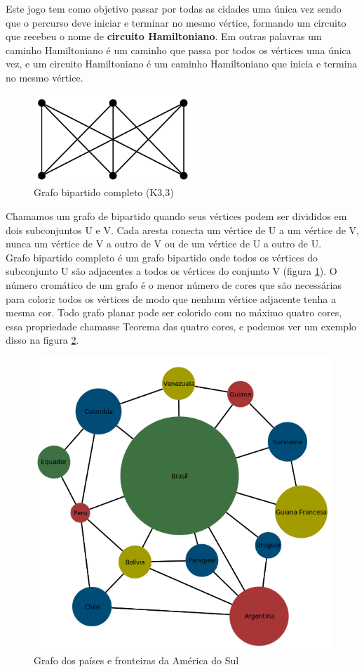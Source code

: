 \documentclass[a4paper]{abnt}
\begin{document}
Este jogo tem como objetivo passar por todas as cidades uma única vez sendo que o percurso deve iniciar e terminar no mesmo vértice, formando um circuito que recebeu o nome de \textbf{circuito Hamiltoniano}. Em outras palavras um caminho Hamiltoniano é um caminho que passa por todos os vértices uma única vez, e um circuito Hamiltoniano é um caminho Hamiltoniano que inicia e termina no mesmo vértice.

\begin{figure}[htb]
    \centering
	\includegraphics[width=6cm]{k33.png}
	\caption{Grafo bipartido completo (K3,3)}
	\label{img_k33}
\end{figure}

Chamamos um grafo de bipartido quando seus vértices podem ser divididos em dois subconjuntos U e V.  Cada aresta conecta um vértice de U a um vértice de V, nunca um vértice de V a outro de V ou de um vértice de U a outro de U.\\Grafo bipartido completo é um grafo bipartido onde todos os vértices do subconjunto U são adjacentes a todos os vértices do conjunto V (figura \ref{img_k33}).
O número cromático de um grafo é o menor número de cores que são necessárias para colorir todos os vértices de modo que nenhum vértice adjacente tenha a mesma cor. Todo grafo planar pode ser colorido com no máximo quatro cores, essa propriedade chamasse Teorema das quatro cores, e podemos ver um exemplo disso na figura \ref{img_graph_color}.

\begin{figure}[htb]
    \centering
	\includegraphics[width=12cm]{graph_color.png}
	\caption{Grafo dos países e fronteiras da América do Sul}
	\label{img_graph_color}
\end{figure}
\end{document}
